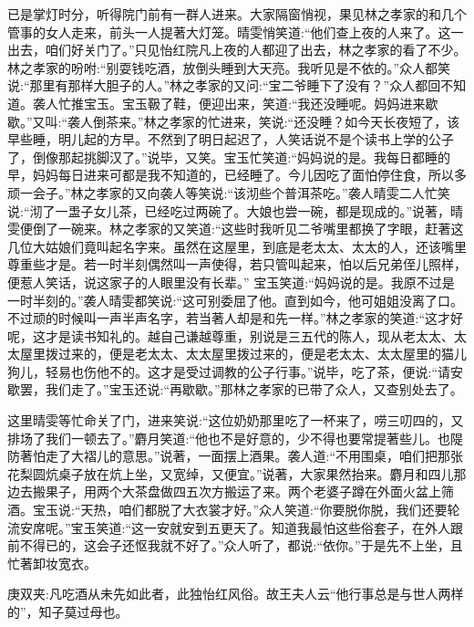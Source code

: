 \begin{parag}
    已是掌灯时分，听得院门前有一群人进来。大家隔窗悄视，果见林之孝家的和几个管事的女人走来，前头一人提著大灯笼。晴雯悄笑道:“他们查上夜的人来了。这一出去，咱们好关门了。”只见怡红院凡上夜的人都迎了出去，林之孝家的看了不少。林之孝家的吩咐:“别耍钱吃酒，放倒头睡到大天亮。我听见是不依的。”众人都笑说:“那里有那样大胆子的人。”林之孝家的又问:“宝二爷睡下了没有？”众人都回不知道。袭人忙推宝玉。宝玉靸了鞋，便迎出来，笑道:“我还没睡呢。妈妈进来歇歇。”又叫:“袭人倒茶来。”林之孝家的忙进来，笑说:“还没睡？如今天长夜短了，该早些睡，明儿起的方早。不然到了明日起迟了，人笑话说不是个读书上学的公子了，倒像那起挑脚汉了。”说毕，又笑。宝玉忙笑道:“妈妈说的是。我每日都睡的早，妈妈每日进来可都是我不知道的，已经睡了。今儿因吃了面怕停住食，所以多顽一会子。”林之孝家的又向袭人等笑说:“该沏些个普洱茶吃。”袭人晴雯二人忙笑说:“沏了一盄子女儿茶，已经吃过两碗了。大娘也尝一碗，都是现成的。”说著，晴雯便倒了一碗来。林之孝家的又笑道:“这些时我听见二爷嘴里都换了字眼，赶著这几位大姑娘们竟叫起名字来。虽然在这屋里，到底是老太太、太太的人，还该嘴里尊重些才是。若一时半刻偶然叫一声使得，若只管叫起来，怕以后兄弟侄儿照样，便惹人笑话，说这家子的人眼里没有长辈。” 宝玉笑道:“妈妈说的是。我原不过是一时半刻的。”袭人晴雯都笑说:“这可别委屈了他。直到如今，他可姐姐没离了口。不过顽的时候叫一声半声名字，若当著人却是和先一样。”林之孝家的笑道:“这才好呢，这才是读书知礼的。越自己谦越尊重，别说是三五代的陈人，现从老太太、太太屋里拨过来的，便是老太太、太太屋里拨过来的，便是老太太、太太屋里的猫儿狗儿，轻易也伤他不的。这才是受过调教的公子行事。”说毕，吃了茶，便说:“请安歇罢，我们走了。”宝玉还说:“再歇歇。”那林之孝家的已带了众人，又查别处去了。
\end{parag}


\begin{parag}
    这里晴雯等忙命关了门，进来笑说:“这位奶奶那里吃了一杯来了，唠三叨四的，又排场了我们一顿去了。”麝月笑道:“他也不是好意的，少不得也要常提著些儿。也隄防著怕走了大褶儿的意思。”说著，一面摆上酒果。袭人道:“不用围桌，咱们把那张花梨圆炕桌子放在炕上坐，又宽绰，又便宜。”说著，大家果然抬来。麝月和四儿那边去搬果子，用两个大茶盘做四五次方搬运了来。两个老婆子蹲在外面火盆上筛酒。宝玉说:“天热，咱们都脱了大衣裳才好。”众人笑道:“你要脱你脱，我们还要轮流安席呢。”宝玉笑道:“这一安就安到五更天了。知道我最怕这些俗套子，在外人跟前不得已的，这会子还怄我就不好了。”众人听了，都说:“依你。”于是先不上坐，且忙著卸妆宽衣。\begin{note}庚双夹:凡吃酒从未先如此者，此独怡红风俗。故王夫人云“他行事总是与世人两样的”，知子莫过母也。\end{note}
\end{parag}


